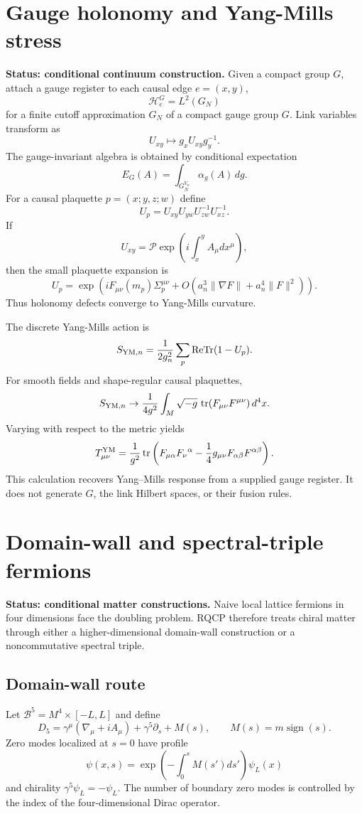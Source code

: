 \documentclass[11pt]{article}
\newcommand{\Hh}{\mathcal H}
\begin{document}
\section{Gauge holonomy and Yang-Mills stress}\label{app:gauge}

\textbf{Status: conditional continuum construction.}
Given a compact group \(G\), attach a gauge register to each causal edge
$e=(x,y)$,
\[
\Hh_e^G=L^2(G_N)
\]
for a finite cutoff approximation $G_N$ of a compact gauge group $G$.  Link variables transform as
\[
U_{xy}\mapsto g_xU_{xy}g_y^{-1}.
\]
The gauge-invariant algebra is obtained by conditional expectation
\[
E_G(A)=\int_{G_N^{V_n}}\alpha_g(A)\,dg.
\]
For a causal plaquette $p=(x;y,z;w)$ define
\[
U_p=U_{xy}U_{yw}U_{zw}^{-1}U_{xz}^{-1}.
\]
If
\[
U_{xy}=\mathcal P\exp\left(i\int_x^yA_\mu dx^\mu\right),
\]
then the small plaquette expansion is
\[
U_p=\exp\left(iF_{\mu\nu}(m_p)\Sigma_p^{\mu\nu}+O(a_n^3\|\nabla F\|+a_n^4\|F\|^2)\right).
\]
Thus holonomy defects converge to Yang-Mills curvature.

The discrete Yang-Mills action is
\[
S_{{\rm YM},n}=\frac{1}{2g_n^2}\sum_p\operatorname{ReTr}(1-U_p).
\]
For smooth fields and shape-regular causal plaquettes,
\[
S_{{\rm YM},n}\to\frac{1}{4g^2}\int_M\sqrt{-g}\,\operatorname{tr}(F_{\mu\nu}F^{\mu\nu})\,d^4x.
\]
Varying with respect to the metric yields
\[
T_{\mu\nu}^{\rm YM}=\frac{1}{g^2}\operatorname{tr}\left(F_{\mu\alpha}F_\nu{}^\alpha-\frac14g_{\mu\nu}F_{\alpha\beta}F^{\alpha\beta}\right).
\]
This calculation recovers Yang--Mills response from a supplied gauge
register.  It does not generate \(G\), the link Hilbert spaces, or their
fusion rules.

\section{Domain-wall and spectral-triple fermions}\label{app:fermions}

\textbf{Status: conditional matter constructions.}
Naive local lattice fermions in four dimensions face the doubling problem.  RQCP therefore treats chiral matter through either a higher-dimensional domain-wall construction or a noncommutative spectral triple.

\subsection*{Domain-wall route}
Let $\mathcal B^5=M^4\times[-L,L]$ and define
\[
D_5=\gamma^\mu(\nabla_\mu+iA_\mu)+\gamma^5\partial_s+M(s),
\qquad
M(s)=m\operatorname{sign}(s).
\]
Zero modes localized at $s=0$ have profile
\[
\psi(x,s)=\exp\left(-\int_0^sM(s')ds'\right)\psi_L(x)
\]
and chirality $\gamma^5\psi_L=-\psi_L$.  The number of boundary zero modes is controlled by the index of the four-dimensional Dirac operator.
\end{document}
